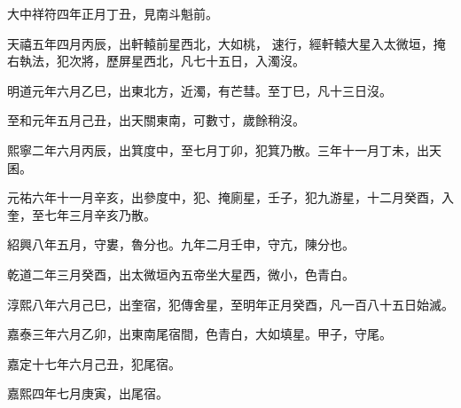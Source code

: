 \begin{pinyinscope}
 大中祥符四年正月丁丑，見南斗魁前。



 天禧五年四月丙辰，出軒轅前星西北，大如桃，
 速行，經軒轅大星入太微垣，掩右執法，犯次將，歷屏星西北，凡七十五日，入濁沒。



 明道元年六月乙巳，出東北方，近濁，有芒彗。至丁巳，凡十三日沒。



 至和元年五月己丑，出天關東南，可數寸，歲餘稍沒。



 熙寧二年六月丙辰，出箕度中，至七月丁卯，犯箕乃散。三年十一月丁未，出天囷。



 元祐六年十一月辛亥，出參度中，犯、掩廁星，壬子，犯九游星，十二月癸酉，入奎，至七年三月辛亥乃散。



 紹興八年五月，守婁，魯分也。九年二月壬申，守亢，陳分也。



 乾道二年三月癸酉，出太微垣內五帝坐大星西，微小，色青白。



 淳熙八年六月己巳，出奎宿，犯傳舍星，至明年正月癸酉，凡一百八十五日始滅。



 嘉泰三年六月乙卯，出東南尾宿間，色青白，大如填星。甲子，守尾。



 嘉定十七年六月己丑，犯尾宿。



 嘉熙四年七月庚寅，出尾宿。



\end{pinyinscope}